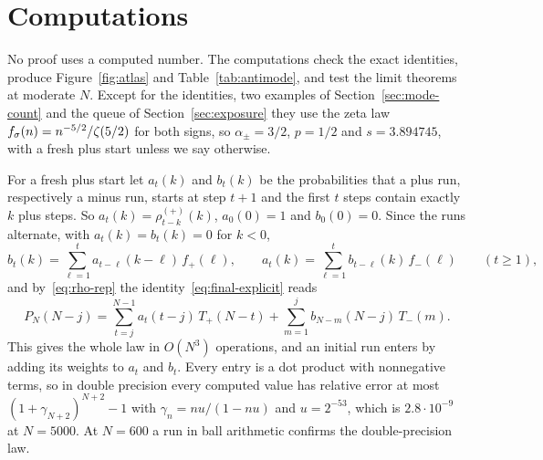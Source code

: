 \section{Computations}\label{sec:verify}

No proof uses a computed number. The computations check the exact identities,
produce Figure~\ref{fig:atlas} and Table~\ref{tab:antimode}, and test the limit
theorems at moderate $N$. Except for the identities, two examples of
Section~\ref{sec:mode-count} and the queue of Section~\ref{sec:exposure} they use the zeta law
$f_\sigma(n)=n^{-5/2}/\zeta(5/2)$ for both signs, so $\alpha_\pm=3/2$, $p=1/2$ and
$s=3.894745$, with a fresh plus start unless we say otherwise.

For a fresh plus start let $a_t(k)$ and $b_t(k)$ be the probabilities that a plus
run, respectively a minus run, starts at step $t+1$ and the first $t$ steps contain
exactly $k$ plus steps. So $a_t(k)=\rho^{(\plus)}_{t-k}(k)$, $a_0(0)=1$ and $b_0(0)=0$.
Since the runs alternate, with $a_t(k)=b_t(k)=0$ for $k<0$,
\begin{equation}\label{eq:run-recursion}
 b_t(k)=\sum_{\ell=1}^{t}a_{t-\ell}(k-\ell)\,f_\plus(\ell),\qquad
 a_t(k)=\sum_{\ell=1}^{t}b_{t-\ell}(k)\,f_\minus(\ell)\qquad(t\ge1),
\end{equation}
and by~\eqref{eq:rho-rep} the identity~\eqref{eq:final-explicit} reads
\begin{equation}\label{eq:run-sum}
 P_N(N-j)=\sum_{t=j}^{N-1}a_t(t-j)\,T_\plus(N-t)+\sum_{m=1}^{j}b_{N-m}(N-j)\,T_\minus(m).
\end{equation}
This gives the whole law in $O(N^3)$ operations, and an initial run enters by adding its
weights to $a_t$ and $b_t$. Every entry is a dot product with nonnegative terms, so in
double precision every computed value has relative error at most
$(1+\gamma_{N+2})^{N+2}-1$ with $\gamma_n=nu/(1-nu)$ and $u=2^{-53}$, which is
$2.8\cdot10^{-9}$ at $N=5000$. At $N=600$ a run in ball arithmetic confirms the
double-precision law.

